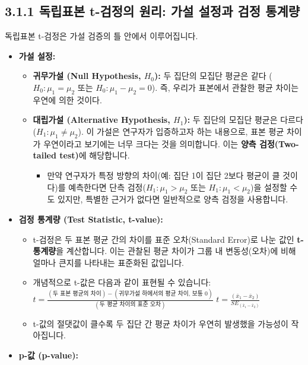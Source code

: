 \documentclass[
  letterpaper,
]{book}
\providecommand{\tightlist}{%
  \setlength{\itemsep}{0pt}\setlength{\parskip}{0pt}}
\begin{document}
\subsection{3.1.1 독립표본 t-검정의 원리: 가설 설정과 검정
통계량}\label{uxb3c5uxb9bduxd45cuxbcf8-t-uxac80uxc815uxc758-uxc6d0uxb9ac-uxac00uxc124-uxc124uxc815uxacfc-uxac80uxc815-uxd1b5uxacc4uxb7c9}

독립표본 t-검정은 가설 검증의 틀 안에서 이루어집니다.

\begin{itemize}
\tightlist
\item
  \textbf{가설 설정:}

  \begin{itemize}
  \tightlist
  \item
    \textbf{귀무가설 (Null Hypothesis, \(H_0\)):} 두 집단의 모집단
    평균은 같다 (\(H_0: \mu_1 = \mu_2\) 또는
    \(H_0: \mu_1 - \mu_2 = 0\)). 즉, 우리가 표본에서 관찰한 평균 차이는
    우연에 의한 것이다.
  \item
    \textbf{대립가설 (Alternative Hypothesis, \(H_1\)):} 두 집단의
    모집단 평균은 다르다 (\(H_1: \mu_1 \neq \mu_2\)). 이 가설은 연구자가
    입증하고자 하는 내용으로, 표본 평균 차이가 우연이라고 보기에는 너무
    크다는 것을 의미합니다. 이는 \textbf{양측 검정(Two-tailed test)}에
    해당합니다.

    \begin{itemize}
    \tightlist
    \item
      만약 연구자가 특정 방향의 차이(예: 집단 1이 집단 2보다 평균이 클
      것이다)를 예측한다면 단측 검정(\(H_1: \mu_1 > \mu_2\) 또는
      \(H_1: \mu_1 < \mu_2\))을 설정할 수도 있지만, 특별한 근거가 없다면
      일반적으로 양측 검정을 사용합니다.
    \end{itemize}
  \end{itemize}
\item
  \textbf{검정 통계량 (Test Statistic, t-value):}

  \begin{itemize}
  \tightlist
  \item
    t-검정은 두 표본 평균 간의 차이를 표준 오차(Standard Error)로 나눈
    값인 \textbf{t-통계량}을 계산합니다. 이는 관찰된 평균 차이가 그룹 내
    변동성(오차)에 비해 얼마나 큰지를 나타내는 표준화된 값입니다.
  \item
    개념적으로 t-값은 다음과 같이 표현될 수 있습니다:
    \(t = \frac{(\text{두 표본 평균의 차이}) - (\text{귀무가설 하에서의 평균 차이, 보통 0})}{(\text{두 평균 차이의 표준 오차})}\)
    \(t = \frac{(\bar{x}_1 - \bar{x}_2)}{SE_{(\bar{x}_1 - \bar{x}_2)}}\)
  \item
    t-값의 절댓값이 클수록 두 집단 간 평균 차이가 우연히 발생했을
    가능성이 작아집니다.
  \end{itemize}
\item
  \textbf{p-값 (p-value):}


\end{itemize}
\end{document}
